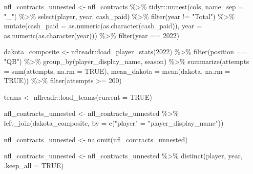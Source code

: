 \documentclass[
  letterpaper,
]{krantz}
\newenvironment{Shaded}{\begin{snugshade}}{\end{snugshade}}
\newcommand{\AttributeTok}[1]{\textcolor[rgb]{0.40,0.45,0.13}{#1}}
\newcommand{\ConstantTok}[1]{\textcolor[rgb]{0.56,0.35,0.01}{#1}}
\newcommand{\DecValTok}[1]{\textcolor[rgb]{0.68,0.00,0.00}{#1}}
\newcommand{\FunctionTok}[1]{\textcolor[rgb]{0.28,0.35,0.67}{#1}}
\newcommand{\NormalTok}[1]{\textcolor[rgb]{0.00,0.23,0.31}{#1}}
\newcommand{\OtherTok}[1]{\textcolor[rgb]{0.00,0.23,0.31}{#1}}
\newcommand{\SpecialCharTok}[1]{\textcolor[rgb]{0.37,0.37,0.37}{#1}}
\newcommand{\StringTok}[1]{\textcolor[rgb]{0.13,0.47,0.30}{#1}}
\begin{document}
\begin{Shaded}
\begin{Highlighting}[]
\NormalTok{nfl\_contracts\_unnested }\OtherTok{\textless{}{-}}\NormalTok{ nfl\_contracts }\SpecialCharTok{\%\textgreater{}\%}
\NormalTok{  tidyr}\SpecialCharTok{::}\FunctionTok{unnest}\NormalTok{(cols, }\AttributeTok{name\_sep =} \StringTok{"\_"}\NormalTok{) }\SpecialCharTok{\%\textgreater{}\%}
  \FunctionTok{select}\NormalTok{(player, year, cash\_paid) }\SpecialCharTok{\%\textgreater{}\%}
  \FunctionTok{filter}\NormalTok{(year }\SpecialCharTok{!=} \StringTok{"Total"}\NormalTok{) }\SpecialCharTok{\%\textgreater{}\%}
  \FunctionTok{mutate}\NormalTok{(}\AttributeTok{cash\_paid =} \FunctionTok{as.numeric}\NormalTok{(}\FunctionTok{as.character}\NormalTok{(cash\_paid)),}
         \AttributeTok{year =} \FunctionTok{as.numeric}\NormalTok{(}\FunctionTok{as.character}\NormalTok{(year))) }\SpecialCharTok{\%\textgreater{}\%}
  \FunctionTok{filter}\NormalTok{(year }\SpecialCharTok{==} \DecValTok{2022}\NormalTok{)}

\NormalTok{dakota\_composite }\OtherTok{\textless{}{-}}\NormalTok{ nflreadr}\SpecialCharTok{::}\FunctionTok{load\_player\_stats}\NormalTok{(}\DecValTok{2022}\NormalTok{) }\SpecialCharTok{\%\textgreater{}\%}
  \FunctionTok{filter}\NormalTok{(position }\SpecialCharTok{==} \StringTok{"QB"}\NormalTok{) }\SpecialCharTok{\%\textgreater{}\%}
  \FunctionTok{group\_by}\NormalTok{(player\_display\_name, season) }\SpecialCharTok{\%\textgreater{}\%}
  \FunctionTok{summarize}\NormalTok{(}\AttributeTok{attempts =} \FunctionTok{sum}\NormalTok{(attempts, }\AttributeTok{na.rm =} \ConstantTok{TRUE}\NormalTok{),}
            \AttributeTok{mean\_dakota =} \FunctionTok{mean}\NormalTok{(dakota, }\AttributeTok{na.rm =} \ConstantTok{TRUE}\NormalTok{)) }\SpecialCharTok{\%\textgreater{}\%}
  \FunctionTok{filter}\NormalTok{(attempts }\SpecialCharTok{\textgreater{}=} \DecValTok{200}\NormalTok{)}

\NormalTok{teams }\OtherTok{\textless{}{-}}\NormalTok{ nflreadr}\SpecialCharTok{::}\FunctionTok{load\_teams}\NormalTok{(}\AttributeTok{current =} \ConstantTok{TRUE}\NormalTok{)}

\NormalTok{nfl\_contracts\_unnested }\OtherTok{\textless{}{-}}\NormalTok{ nfl\_contracts\_unnested }\SpecialCharTok{\%\textgreater{}\%}
  \FunctionTok{left\_join}\NormalTok{(dakota\_composite, }\AttributeTok{by =} \FunctionTok{c}\NormalTok{(}\StringTok{"player"} \OtherTok{=} \StringTok{"player\_display\_name"}\NormalTok{))}

\NormalTok{nfl\_contracts\_unnested }\OtherTok{\textless{}{-}} \FunctionTok{na.omit}\NormalTok{(nfl\_contracts\_unnested)}

\NormalTok{nfl\_contracts\_unnested }\OtherTok{\textless{}{-}}\NormalTok{ nfl\_contracts\_unnested }\SpecialCharTok{\%\textgreater{}\%}
  \FunctionTok{distinct}\NormalTok{(player, year, }\AttributeTok{.keep\_all =} \ConstantTok{TRUE}\NormalTok{)}
\end{Highlighting}
\end{Shaded}
\end{document}
